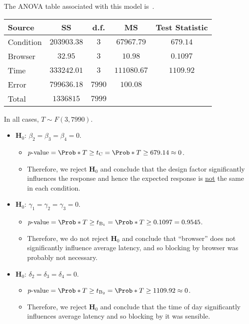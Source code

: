 The ANOVA table associated with this model is~.
\begin{center}
    \captionsetup{type=table}\label{netflixex2}
    \begin{NiceTabular}{|l|c|c|c|c|}
        \toprule
        Source    & SS                     & d.f.        & MS                                                                   & Test Statistic                                           \\
        \midrule
        Condition & $ 203903.38 $ & $ 3 $     & $ 67967.79 $     & $ 679.14 $ \\
        Browser     & $ 32.95 $ & $ 3 $     & $ 10.98 $     & $ 0.1097 $ \\
        Time     & $ 333242.01 $ & $ 3 $     & $ 111080.67 $     & $ 1109.92 $ \\
        Error     & $ 799636.18 $ & $ 7990 $ & $ 100.08 $ &                                                      \\
        \midrule
        Total     & $ 1336815 $ & $ 7999 $\\
        \bottomrule
    \end{NiceTabular}
\end{center}
In all cases, $ T \sim F(3,7990) $.
\begin{itemize}
    \item $ \mathbf{H}_0 $: $ \beta_2=\beta_3=\beta_4=0 $.
          \begin{itemize}
              \item $ p\text{-value}=\Prob*{T\ge t_\text{C}}=\Prob*{T\ge 679.14}\approx 0 $.
              \item Therefore, we reject $ \mathbf{H}_0 $ and conclude that the design factor significantly influences the response
                    and hence the expected response is \underline{not} the same in each condition.
          \end{itemize}
    \item $ \mathbf{H}_0 $: $ \gamma_1=\gamma_2=\gamma_3=0 $.
          \begin{itemize}
              \item $ p\text{-value}=\Prob*{T\ge t_{\text{B}_1}}=\Prob*{T\ge 0.1097}=0.9545 $.
              \item Therefore, we do not reject $ \mathbf{H}_0 $ and conclude that ``browser'' does not
                    significantly influence average latency, and so blocking by browser was probably not necessary.
          \end{itemize}
    \item $ \mathbf{H}_0 $: $ \delta_2=\delta_3=\delta_4=0 $.
          \begin{itemize}
              \item $ p\text{-value}=\Prob*{T\ge t_{\text{B}_2}}=\Prob*{T\ge 1109.92}\approx 0 $.
              \item Therefore, we reject $ \mathbf{H}_0 $ and conclude that the time of day significantly influences average latency
                    and so blocking by it was sensible.
          \end{itemize}
\end{itemize}
